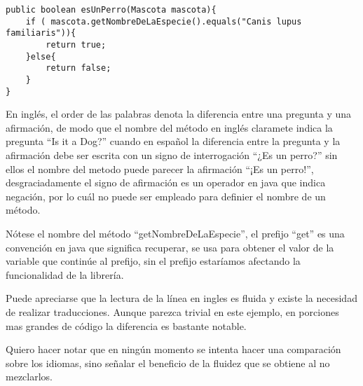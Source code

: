 \begin{lstlisting}
public boolean esUnPerro(Mascota mascota){
	if ( mascota.getNombreDeLaEspecie().equals("Canis lupus familiaris")){
		return true;
	}else{
		return false;
	}
}
\end{lstlisting}

	En inglés, el order de las palabras denota la diferencia entre una pregunta y una afirmación, de modo que el nombre del método en inglés claramete indica la pregunta ``Is it a Dog?'' cuando en español la diferencia entre la pregunta y la afirmación debe ser escrita con un signo de interrogación ``¿Es un perro?'' sin ellos el nombre del metodo puede parecer la afirmación ``¡Es un perro!'', desgraciadamente el signo de afirmación es un operador en java que indica negación, por lo cuál no puede ser empleado para definier el nombre de un método.

	Nótese el nombre del método ``getNombreDeLaEspecie'', el prefijo ``get'' es una convención en java que significa recuperar, se usa para obtener el valor de la variable que continúe al prefijo, sin el prefijo estaríamos afectando la funcionalidad de la librería.

	Puede apreciarse que la lectura de la línea en ingles es fluida y existe la necesidad de realizar traducciones. Aunque parezca trivial en este ejemplo, en porciones mas grandes de código la diferencia es bastante notable.

	Quiero hacer notar que en ningún momento se intenta hacer una comparación sobre los idiomas, sino señalar el beneficio de la fluidez que se obtiene al no mezclarlos.

	

	